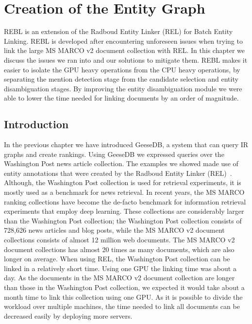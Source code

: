 \chapter{Creation of the Entity Graph}
\label{a-graph-of-entities}

\begin{Abstract}
	\begin{changemargin}{1cm}{1cm}
		REBL is an extension of the Radboud Entity Linker (REL) for Batch Entity Linking. 
		REBL is developed after encountering unforeseen issues when trying to link the large MS MARCO v2 document collection with REL. In this chapter we discuss the issues we ran into and our solutions to mitigate them. REBL makes it easier to isolate the GPU heavy operations from the CPU heavy operations, by separating the mention detection stage from the candidate selection and entity disambiguation stages. By improving the entity disambiguation module we were able to lower the time needed for linking documents by an order of magnitude.
	\end{changemargin}
\end{Abstract}

\section{Introduction}
In the previous chapter we have introduced GeeseDB, a system that can query IR graphs and create rankings. Using GeeseDB we expressed queries over the Washington Post news article collection. The examples we showed made use of entity annotations that were created by the Radboud Entity Linker (REL)~\citep{rel}.
Although, the Washington Post collection is used for retrieval experiments, it is mostly used as a benchmark for news retrieval. 
In recent years, the MS MARCO ranking collections have become the de-facto benchmark for information retrieval experiments that employ deep learning. These collections are considerably larger than the Washington Post collection; the Washington Post collection consists of 728,626 news articles and blog posts, while the MS MARCO v2 document collections consists of almost 12 million web documents. The MS MARCO v2 document collections has almost 20 times as many documents, which are also longer on average.
When using REL, the Washington Post collection can be linked in a relatively short time. Using one GPU the linking time was about a day. As the documents in the MS MARCO v2 document collection are longer than those in the Washington Post collection, we expected it would take about a month time to link this collection using one GPU. As it is possible to divide the workload over multiple machines, the time needed to link all documents can be decreased easily by deploying more servers. 

